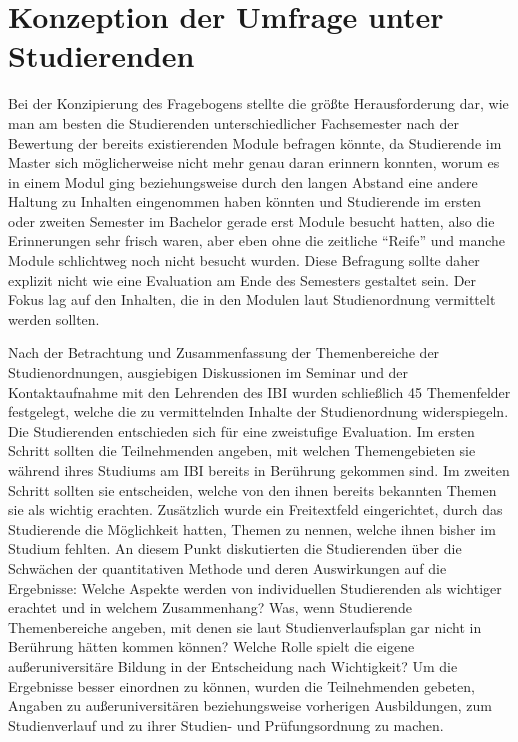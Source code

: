\documentclass[a4paper,
fontsize=11pt,
oneside,
numbers=noperiodatend,
parskip=half-,
bibliography=totoc,
final
]{scrartcl}
\begin{document}
\hypertarget{konzeption-der-umfrage-unter-studierenden}{%
\section{Konzeption der Umfrage unter
Studierenden}\label{konzeption-der-umfrage-unter-studierenden}}

Bei der Konzipierung des Fragebogens stellte die größte Herausforderung
dar, wie man am besten die Studierenden unterschiedlicher Fachsemester
nach der Bewertung der bereits existierenden Module befragen könnte, da
Studierende im Master sich möglicherweise nicht mehr genau daran
erinnern konnten, worum es in einem Modul ging beziehungsweise durch den
langen Abstand eine andere Haltung zu Inhalten eingenommen haben könnten
und Studierende im ersten oder zweiten Semester im Bachelor gerade erst
Module besucht hatten, also die Erinnerungen sehr frisch waren, aber
eben ohne die zeitliche \enquote{Reife} und manche Module schlichtweg
noch nicht besucht wurden. Diese Befragung sollte daher explizit nicht
wie eine Evaluation am Ende des Semesters gestaltet sein. Der Fokus lag
auf den Inhalten, die in den Modulen laut Studienordnung vermittelt
werden sollten.

Nach der Betrachtung und Zusammenfassung der Themenbereiche der
Studienordnungen, ausgiebigen Diskussionen im Seminar und der
Kontaktaufnahme mit den Lehrenden des IBI wurden schließlich 45
Themenfelder festgelegt, welche die zu vermittelnden Inhalte der
Studienordnung widerspiegeln. Die Studierenden entschieden sich für eine
zweistufige Evaluation. Im ersten Schritt sollten die Teilnehmenden
angeben, mit welchen Themengebieten sie während ihres Studiums am IBI
bereits in Berührung gekommen sind. Im zweiten Schritt sollten sie
entscheiden, welche von den ihnen bereits bekannten Themen sie als
wichtig erachten. Zusätzlich wurde ein Freitextfeld eingerichtet, durch
das Studierende die Möglichkeit hatten, Themen zu nennen, welche ihnen
bisher im Studium fehlten. An diesem Punkt diskutierten die Studierenden
über die Schwächen der quantitativen Methode und deren Auswirkungen auf
die Ergebnisse: Welche Aspekte werden von individuellen Studierenden als
wichtiger erachtet und in welchem Zusammenhang? Was, wenn Studierende
Themenbereiche angeben, mit denen sie laut Studienverlaufsplan gar nicht
in Berührung hätten kommen können? Welche Rolle spielt die eigene
außeruniversitäre Bildung in der Entscheidung nach Wichtigkeit? Um die
Ergebnisse besser einordnen zu können, wurden die Teilnehmenden gebeten,
Angaben zu außeruniversitären beziehungsweise vorherigen Ausbildungen,
zum Studienverlauf und zu ihrer Studien- und Prüfungsordnung zu machen.
\end{document}
